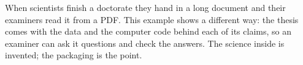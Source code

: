When scientists finish a doctorate they hand in a long document and their
examiners read it from a PDF. This example shows a different way: the thesis
comes with the data and the computer code behind each of its claims, so an
examiner can ask it questions and check the answers. The science inside is
invented; the packaging is the point.

